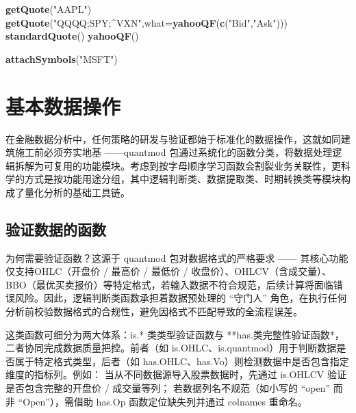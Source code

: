 \documentclass[]{ctexbook}
\newenvironment{Shaded}{\begin{snugshade}}{\end{snugshade}}
\newcommand{\AttributeTok}[1]{\textcolor[rgb]{0.13,0.29,0.53}{#1}}
\newcommand{\FunctionTok}[1]{\textcolor[rgb]{0.13,0.29,0.53}{\textbf{#1}}}
\newcommand{\NormalTok}[1]{#1}
\newcommand{\StringTok}[1]{\textcolor[rgb]{0.31,0.60,0.02}{#1}}
\begin{document}
\begin{Shaded}
\begin{Highlighting}[]
\FunctionTok{getQuote}\NormalTok{(}\StringTok{"AAPL"}\NormalTok{)}
\FunctionTok{getQuote}\NormalTok{(}\StringTok{"QQQQ;SPY;\^{}VXN"}\NormalTok{,}\AttributeTok{what=}\FunctionTok{yahooQF}\NormalTok{(}\FunctionTok{c}\NormalTok{(}\StringTok{"Bid"}\NormalTok{,}\StringTok{"Ask"}\NormalTok{)))}
\FunctionTok{standardQuote}\NormalTok{()}
\FunctionTok{yahooQF}\NormalTok{()}
\end{Highlighting}
\end{Shaded}

\begin{Shaded}
\begin{Highlighting}[]
\FunctionTok{attachSymbols}\NormalTok{(}\StringTok{"MSFT"}\NormalTok{)}
\end{Highlighting}
\end{Shaded}

\chapter{基本数据操作}\label{manipulation}

在金融数据分析中，任何策略的研发与验证都始于标准化的数据操作，这就如同建筑施工前必须夯实地基 ------quantmod 包通过系统化的函数分类，将数据处理逻辑拆解为可复用的功能模块。考虑到按字母顺序学习函数会割裂业务关联性，更科学的方式是按功能用途分组，其中逻辑判断类、数据提取类、时期转换类等模块构成了量化分析的基础工具链。

\section{验证数据的函数}\label{ux9a8cux8bc1ux6570ux636eux7684ux51fdux6570}

为何需要验证函数？这源于 quantmod 包对数据格式的严格要求 ------ 其核心功能仅支持OHLC（开盘价 / 最高价 / 最低价 / 收盘价）、OHLCV（含成交量）、BBO（最优买卖报价）等特定格式，若输入数据不符合规范，后续计算将面临错误风险。因此，逻辑判断类函数承担着数据预处理的 ``守门人'' 角色，在执行任何分析前校验数据格式的合规性，避免因格式不匹配导致的全流程误差。

这类函数可细分为两大体系：is.* 类类型验证函数与 **has.类完整性验证函数*，二者协同完成数据质量把控。前者（如 is.OHLC、is.quantmod）用于判断数据是否属于特定格式类型，后者（如 has.OHLC、has.Vo）则检测数据中是否包含指定维度的指标列。例如：
当从不同数据源导入股票数据时，先通过 is.OHLCV 验证是否包含完整的开盘价 / 成交量等列；
若数据列名不规范（如小写的 ``open'' 而非 ``Open''），需借助 has.Op 函数定位缺失列并通过 colnames 重命名。
\end{document}
